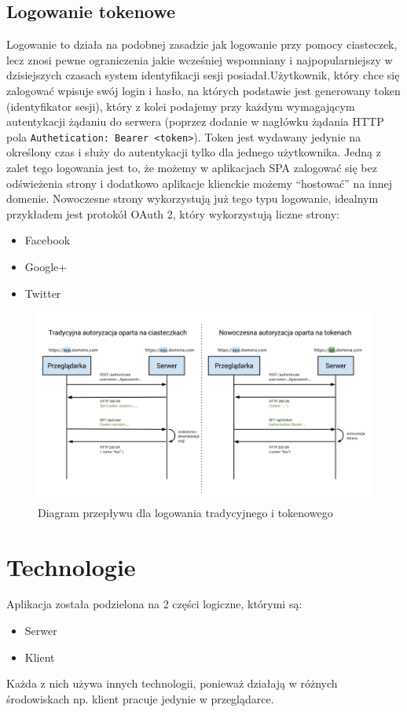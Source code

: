 \documentclass[10pt,titlepage]{article}
\begin{document}
\subsection{Logowanie tokenowe}
Logowanie to działa na podobnej zasadzie jak logowanie przy pomocy ciasteczek, lecz znosi pewne ograniczenia jakie wcześniej wspomniany i najpopularniejszy w dzisiejszych czasach system identyfikacji sesji posiadał.Użytkownik, który chce się zalogować wpisuje swój login i hasło, na których podstawie jest generowany token (identyfikator sesji), który z kolei podajemy przy każdym wymagającym autentykacji żądaniu do serwera (poprzez dodanie w nagłówku żądania HTTP pola \verb|Authetication: Bearer <token>|). Token jest wydawany jedynie na określony czas i służy do autentykacji tylko dla jednego użytkownika. Jedną z zalet tego logowania jest to, że możemy w aplikacjach SPA zalogować się bez odświeżenia strony i dodatkowo aplikacje klienckie możemy ``hostować'' na innej domenie. Nowoczesne strony wykorzystują już tego typu logowanie, idealnym przykładem jest protokół OAuth 2, który wykorzystują liczne strony:
\begin{itemize}
  \item Facebook
  \item Google+
  \item Twitter
\end{itemize}
\begin{figure}[htbp]
  \centering
  \includegraphics[scale=0.5]{tokenAuth.png}
  \caption{Diagram przepływu dla logowania tradycyjnego i tokenowego}
\end{figure}
\section{Technologie}
Aplikacja została podzielona na 2 części logiczne, którymi są:
\begin{itemize}
  \item Serwer
  \item Klient
\end{itemize}
Każda z nich używa innych technologii, ponieważ działają w różnych środowiskach np. klient pracuje jedynie w przeglądarce.
\end{document}
